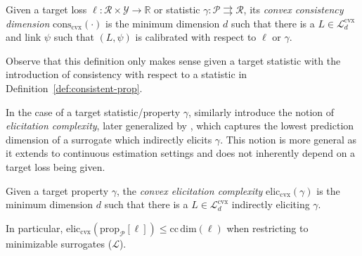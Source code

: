 \documentclass[anon,12pt]{colt2021} %
\newcommand{\Comments}{1}
\newcommand{\mytodo}[2]{\ifnum\Comments=1%
	\todo[linecolor=#1!80!black,backgroundcolor=#1,bordercolor=#1!80!black]{#2}\fi}
\newcommand{\btw}[1]{\mytodo{orange!80!white}{BTW: #1}}
\newcommand{\reals}{\mathbb{R}}
\newcommand{\prop}[2][\mathcal{P}]{\mathrm{prop}_{#1}[#2]}
\newcommand{\eliccvx}{\mathrm{elic}_\mathrm{cvx}}
\newcommand{\conscvx}{\mathrm{cons}_\mathrm{cvx}}
\newcommand{\ccdim}{\mathrm{cc\,dim}}
\renewcommand{\L}{\mathcal{L}}
\newcommand{\Lcvx}{\mathcal{L}^{\text{cvx}}}
\newcommand{\R}{\mathcal{R}}
\renewcommand{\P}{\mathcal{P}}
\newcommand{\Y}{\mathcal{Y}}
\newcommand{\toto}{\rightrightarrows}
\begin{document}
\begin{definition}\label{def:cvx-consistency-dim}
	Given a target loss $\ell:\R \times\Y \to \reals$ or statistic $\gamma: \P \toto \R$, its \emph{convex consistency dimension} $\conscvx(\cdot)$ is the minimum dimension $d$ such that there is a $L \in \Lcvx_d$ and link $\psi$ such that $(L,\psi)$ is calibrated with respect to $\ell$ or $\gamma$.
\end{definition}
Observe that this definition only makes sense given a target statistic with the introduction of consistency with respect to a statistic in Definition~\ref{def:consistent-prop}.

In the case of a target statistic/property $\gamma$, \citet{lambert2008eliciting} similarly introduce the notion of \emph{elicitation complexity}, later generalized by \citet{frongillo2020elicitation}, which captures the lowest prediction dimension of a surrogate which indirectly elicits $\gamma$.
This notion is more general as it extends to continuous estimation settings and does not inherently depend on a target loss being given. 

\begin{definition}
	Given a target property $\gamma$, the \emph{convex elicitation complexity} $\eliccvx(\gamma)$ is the minimum dimension $d$ such that there is a $L \in \Lcvx_d$ indirectly eliciting $\gamma$.
\end{definition}
In particular, $\eliccvx(\prop{\ell}) \leq \ccdim(\ell)$ when restricting to minimizable surrogates ($\L$).

\end{document}
